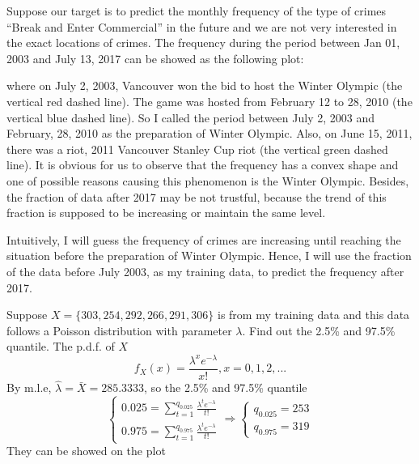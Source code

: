 \documentclass[12pt]{article}
\begin{document}
Suppose our target is to predict the monthly frequency of the type of
crimes ``Break and Enter Commercial'' in the future and we are not very
interested in the exact locations of crimes. The frequency during the
period between Jan 01, 2003 and July 13, 2017 can be showed as the
following plot:

where on July 2, 2003, Vancouver won the bid to host the Winter Olympic
(the vertical red dashed line). The game was hosted from February 12 to
28, 2010 (the vertical blue dashed line). So I called the period between
July 2, 2003 and February, 28, 2010 as the preparation of Winter
Olympic. Also, on June 15, 2011, there was a riot, 2011 Vancouver
Stanley Cup riot (the vertical green dashed line). It is obvious for us
to observe that the frequency has a convex shape and one of possible
reasons causing this phenomenon is the Winter Olympic. Besides, the
fraction of data after 2017 may be not trustful, because the trend of
this fraction is supposed to be increasing or maintain the same level.

\par

Intuitively, I will guess the frequency of crimes are increasing until
reaching the situation before the preparation of Winter Olympic. Hence,
I will use the fraction of the data before July 2003, as my training
data, to predict the frequency after 2017.

Suppose \(X = \{303, 254, 292, 266, 291, 306\}\) is from my training
data and this data follows a Poisson distribution with parameter
\(\lambda\). Find out the 2.5\% and 97.5\% quantile. The p.d.f. of \(X\)
\begin{equation*}
        f_X(x) = \frac{\lambda^{x}e^{-\lambda}}{x!} , x = 0, 1, 2, ...
    \end{equation*} By m.l.e, \(\hat{\lambda} = \bar{X} = 285.3333\), so
the 2.5\% and 97.5\% quantile \begin{equation*}
        \begin{cases}
            0.025 = \sum_{t = 1}^{q_{0.025}}\frac{\lambda^{t}e^{-\lambda}}{t!} \\
            0.975 = \sum_{t = 1}^{q_{0.975}}\frac{\lambda^{t}e^{-\lambda}}{t!} 
        \end{cases} \Rightarrow \begin{cases}
            q_{0.025} = 253 \\
            q_{0.975} = 319
        \end{cases}
    \end{equation*} They can be showed on the plot
\end{document}
